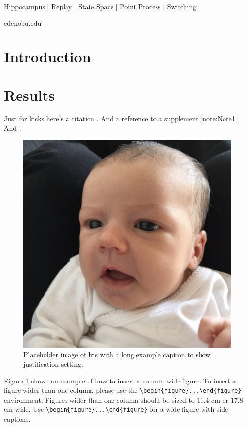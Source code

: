 \documentclass[times, twoside, watermark]{zHenriquesLab-StyleBioRxiv}
\begin{document}
\begin{keywords}
Hippocampus | Replay | State Space | Point Process | Switching
\end{keywords}

\begin{corrauthor}
edeno\at bu.edu
\end{corrauthor}

\section*{Introduction}
\Blindtext

\section*{Results}

Just for kicks here's a citation \cite{Gustafsson2016}. And a reference to a supplement \cref{note:Note1}. And .
\Blindtext

\begin{figure}%
\centering
\includegraphics[width=.8\linewidth]{Figures/Figure_1}
\caption{Placeholder image of Iris with a long example caption to show justification setting.}
\label{fig:computerNo}
\end{figure}

\Blindtext

Figure \ref{fig:computerNo} shows an example of how to insert a column-wide figure. To insert a figure wider than one column, please use the \verb|\begin{figure}...\end{figure}| environment. Figures wider than one column should be sized to 11.4 cm or 17.8 cm wide. Use \verb|\begin{figure}...\end{figure}| for a wide figure with side captions.
\end{document}
